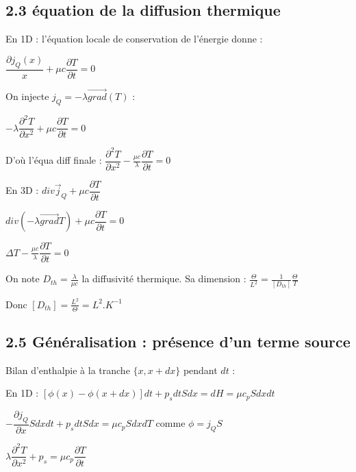 \documentclass[a4paper,12pt]{book}
\begin{document}
\subsection{2.3 équation de la diffusion thermique}
En 1D : l'équation locale de conservation de l'énergie donne :  \par $\dfrac{\partial j_Q(x)}{x} + \mu c\dfrac{\partial T}{\partial t}=0$ \par On injecte $j_Q=-\lambda\vec{grad}(T)$ : \par $-\lambda\dfrac{\partial^2 T}{\partial x^2}+\mu c\dfrac{\partial T}{\partial t}=0$ \par D'où l'équa diff finale : $\dfrac{\partial^2 T}{\partial x^2} - \frac{\mu c}{\lambda}\dfrac{\partial T}{\partial t}=0$
\par En 3D : $div\vec{j}_Q +\mu c\dfrac{\partial T}{\partial t}$ \par $div(-\lambda\vec{grad}T)+\mu c\dfrac{\partial T}{\partial t} = 0$ \par $\Delta T - \frac{\mu c}{\lambda}\dfrac{\partial T}{\partial t}=0$
\par On note $D_{th}=\frac{\lambda}{\mu c}$ la diffusivité thermique. Sa dimension : $\frac{\Theta}{L^2}=\frac{1}{[D_{th}]}\frac{\Theta}{T}$ \par Donc $[D_{th}]=\frac{L^2}{\Theta} = L^2.K^{-1}$



\subsection{2.5 Généralisation : présence d'un terme source}
Bilan d'enthalpie à la tranche $\{x, x+dx\}$ pendant $dt$ : \par En 1D : $[\phi(x)-\phi(x+dx)]dt + p_sdtSdx = dH = \mu c_pSdxdt$ \par $-\dfrac{\partial j_Q}{\partial x}Sdxdt+p_sdtSdx = \mu c_pSdxdT$ comme $\phi = j_QS$ \par $\lambda\dfrac{\partial^2 T}{\partial x^2}+p_s = \mu c_p\dfrac{\partial T}{\partial t}$
\end{document}
